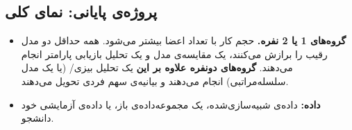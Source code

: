 \subsection{پروژه‌ی پایانی: نمای کلی}

\begin{itemize}
\tightlist
\item
  \textbf{گروه‌های 1 یا 2 نفره.} حجم کار با تعداد اعضا بیشتر می‌شود. همه
  حداقل دو مدل رقیب را برازش می‌کنند، یک مقایسه‌ی مدل و یک تحلیل بازیابی
  پارامتر انجام می‌دهند. \textbf{گروه‌های دونفره علاوه بر این} یک تحلیل
  بیزی/ (یا یک مدل سلسله‌مراتبی) انجام می‌دهند و بیانیه‌ی سهم فردی
  تحویل می‌دهند.
\item
  \textbf{داده:} داده‌ی شبیه‌سازی‌شده، یک مجموعه‌داده‌ی باز، یا داده‌ی آزمایشی
  خود دانشجو.
\end{itemize}
